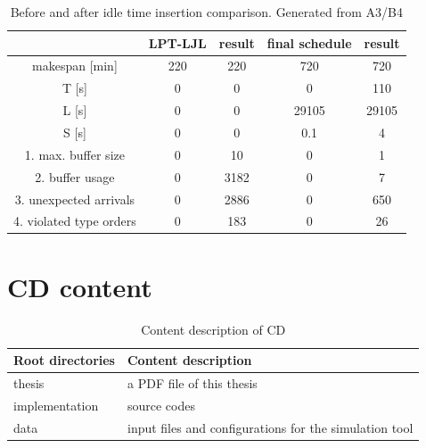 \documentclass{ctuthesis}
\begin{document}
\begin{table}[H]
\begin{tabular}{ |c|| c | c | c | c |} 
\hline
 & LPT-LJL & result & final schedule & result \\ 
\hline
makespan [min] & 220 & 220 & 720 & 720 \\
\hline
T [s]& 0 & 0 & 0 & 110 \\
\hline
L [s]& 0 & 0 & 29105 & 29105 \\
\hline
S [s]& 0 & 0 & 0.1 & 4 \\
\hline
1. max. buffer size & 0 & 10 & 0 & 1\\ 
\hline
2. buffer usage  & 0 & 3182 & 0 & 7\\ 
\hline
3. unexpected arrivals & 0 & 2886 & 0 & 650\\ 
\hline
4. violated type orders & 0 & 183 & 0 & 26\\ 
\hline
\end{tabular}
\caption{Before and after idle time insertion comparison. Generated from A3/B4}
\end{table}


\chapter{CD content}

\begin{table}[H]
\begin{tabular}{  l  l } 
\hline
 \textbf{Root directories} & \textbf{Content description} \\ 
 \hline
thesis & a PDF file of this thesis \\
implementation & source codes \\
data & input files and configurations for the simulation tool \\
\hline
\end{tabular}
\caption{Content description of CD}
\end{table}
\end{document}

